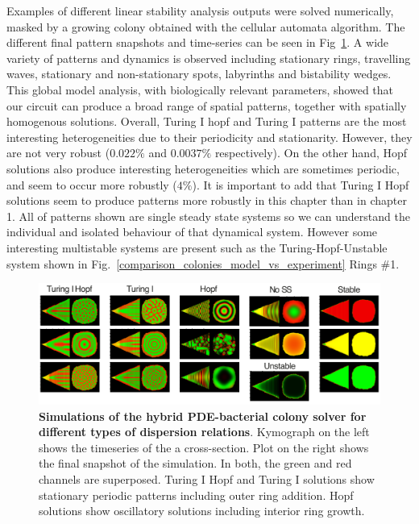 Examples of different linear stability analysis outputs were solved numerically, masked by a growing colony obtained with the cellular automata algorithm.
The different final pattern snapshots and time-series can be seen in Fig~\ref{system_class_simulations}.
A wide variety of patterns and dynamics is observed including stationary rings, travelling waves, stationary and non-stationary spots, labyrinths and bistability wedges.
This global model analysis, with biologically relevant parameters, showed that our circuit can produce a broad range of spatial patterns, together with spatially homogenous solutions.
Overall, Turing I hopf and Turing I patterns are the most interesting heterogeneities due to their periodicity and stationarity.
However, they are not very robust ($0.022\%$ and $0.0037\%$ respectively).
On the other hand, Hopf solutions also produce interesting heterogeneities which are sometimes periodic, and seem to occur more robustly ($4\%$).
It is important to add that Turing I Hopf solutions seem to produce patterns more robustly in this chapter than in chapter 1. %
All of patterns shown are single steady state systems so we can understand the individual and isolated behaviour of that dynamical system.
However some interesting multistable systems are present such as the Turing-Hopf-Unstable system shown in Fig.~\ref{comparison_colonies_model_vs_experiment} Rings \#1.
\begin{figure}[H]
    \centering

    \includegraphics[width=1\textwidth]{chapters/Chapter 3/system_class_simulations}
    \caption{\textbf{Simulations of the hybrid PDE-bacterial colony solver for different types of dispersion relations}. Kymograph on the left shows the timeseries of the a cross-section. Plot on the right shows the final snapshot of the simulation. In both, the green and red channels are superposed. Turing I Hopf and Turing I solutions show stationary periodic patterns including outer ring addition. Hopf solutions show oscillatory solutions including interior ring growth.}
    \label{system_class_simulations}
\end{figure}


